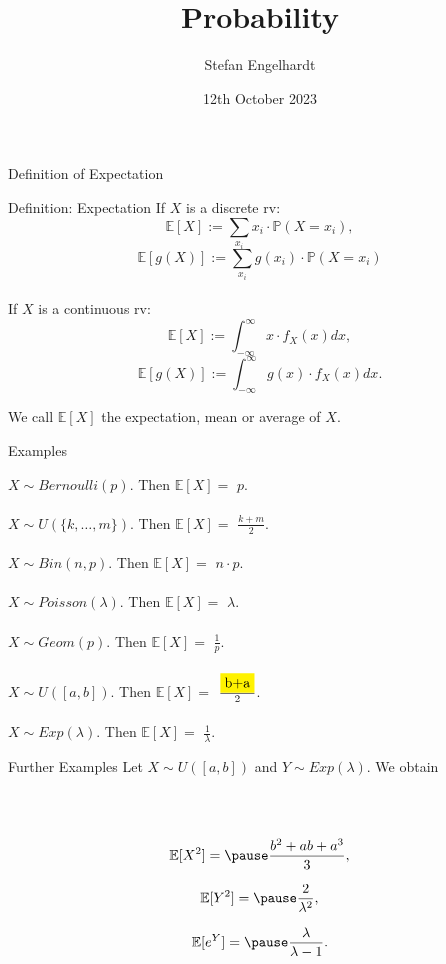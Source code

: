 \documentclass[11pt,pdf,ngerman,UKenglish]{beamer}%
\title{Probability}
\author{Stefan Engelhardt}
\date{12th October 2023}%
\newcommand{\IP}{\mathbb{P}}
\newcommand{\IE}{{\mathbb{E}}}
\newcommand{\1}{\mathbb{1}}
\theoremstyle{thm}
\theoremstyle{def}
\begin{document}
\begin{frame}
\titlepage
\end{frame}
\logo{}




\begin{frame}{Definition of Expectation}
\vspace*{-2mm}
\begin{block}{Definition: Expectation}
If $X$ is a discrete rv:
$$ \IE [ X ] := \sum_{x_i} x_i \cdot \IP( X = x_i),$$
$$ \IE [ g(X) ] := \sum_{x_i} g(x_i) \cdot \IP( X = x_i)$$
\ \\
If $X$ is a continuous rv:
$$ \IE [ X ] := \int_{-\infty}^\infty x \cdot f_X(x) dx,$$
$$ \IE [ g(X) ] := \int_{-\infty}^\infty g(x) \cdot f_X(x) dx.$$
\end{block}
\vfill

We call $\IE[X]$ the expectation, mean or average of $X$.
\end{frame}


\begin{frame}{Examples}

$X \sim Bernoulli(p)$. Then $\IE[X] = $ $p$.
\\ \ \\
$X \sim U(\{k, \ldots, m \})$. Then $\IE[X] = $ $\frac{k+m}{2}$.
\\ \ \\
$X \sim Bin(n,p)$. Then $\IE[X] = $ $n \cdot p$.
\\ \ \\
$X \sim Poisson(\lambda)$. Then $\IE[X] = $ $\lambda$.
\\ \ \\
$X \sim Geom(p)$. Then $\IE[X] = $ $\frac1p$.
\\ \ \\
$X \sim U([a,b])$. Then $\IE[X] = $ $\frac{\colorbox{yellow}{b+a}}{2}$.
\\ \ \\
$X \sim Exp(\lambda)$. Then $\IE[X] = $ $\frac1\lambda$.
\end{frame}


\begin{frame}{Further Examples}
Let $X \sim U([a,b])$ and $Y \sim Exp(\lambda)$. We obtain

\ \\ \ \\
$$\IE[X^2] = \pause \frac{b^2 + ab + a^3}{3},$$

$$\IE[Y^2] = \pause \frac{2}{\lambda^2},$$

$$\IE[e^Y] = \pause \frac{\lambda}{\lambda -1}.$$
\end{frame}
\end{document}

